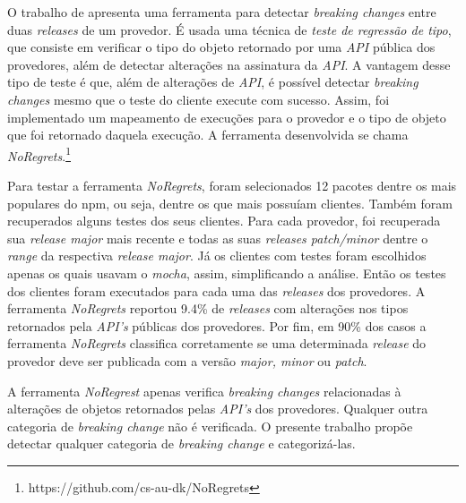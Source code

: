 O trabalho de  apresenta uma ferramenta para detectar \textit{breaking changes} entre duas \textit{releases} de um provedor. É usada uma técnica de \textit{teste de regressão de tipo}, que consiste em verificar o tipo do objeto retornado por uma \textit{API} pública dos provedores, além de detectar alterações na assinatura da \textit{API}. A vantagem desse tipo de teste é que, além de alterações de \textit{API}, é possível detectar \textit{breaking changes} mesmo que o teste do cliente execute com sucesso. Assim, foi implementado um mapeamento de execuções para o provedor e o tipo de objeto que foi retornado daquela execução. A ferramenta desenvolvida se chama \textit{NoRegrets}.\footnote{https://github.com/cs-au-dk/NoRegrets}

Para testar a ferramenta \textit{NoRegrets}, foram selecionados 12 pacotes dentre os mais populares do \gls{npm}, ou seja, dentre os que mais possuíam clientes. Também foram recuperados alguns testes dos seus clientes. Para cada provedor, foi recuperada sua \textit{release major} mais recente e todas as suas \textit{releases patch/minor} dentre o \textit{range} da respectiva \textit{release major}. Já os clientes com testes foram escolhidos apenas os quais usavam o \textit{mocha}, assim, simplificando a análise. Então os testes dos clientes foram executados para cada uma das \textit{releases} dos provedores. A ferramenta \textit{NoRegrets} reportou 9.4\% de \textit{releases} com alterações nos tipos retornados pela \textit{API's} públicas dos provedores. Por fim, em 90\% dos casos a ferramenta \textit{NoRegrets} classifica corretamente se uma determinada \textit{release} do provedor deve ser publicada com a versão \textit{major, minor} ou \textit{patch}.

A ferramenta \textit{NoRegrest} apenas verifica \textit{breaking changes} relacionadas à alterações de objetos retornados pelas \textit{API's} dos provedores. Qualquer outra categoria de \textit{breaking change} não é verificada. O presente trabalho propõe detectar qualquer categoria de \textit{breaking change} e categorizá-las.